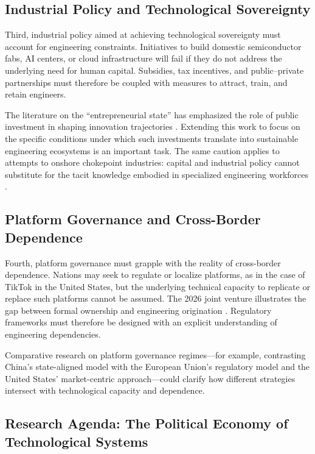 \documentclass[12pt,letterpaper]{article}
\begin{document}
\subsection{Industrial Policy and Technological Sovereignty}

Third, industrial policy aimed at achieving technological sovereignty must account for engineering constraints. Initiatives to build domestic semiconductor fabs, AI centers, or cloud infrastructure will fail if they do not address the underlying need for human capital. Subsidies, tax incentives, and public--private partnerships must therefore be coupled with measures to attract, train, and retain engineers.

The literature on the ``entrepreneurial state'' has emphasized the role of public investment in shaping innovation trajectories \cite{mazzucato2013}. Extending this work to focus on the specific conditions under which such investments translate into sustainable engineering ecosystems is an important task. The same caution applies to attempts to onshore chokepoint industries: capital and industrial policy cannot substitute for the tacit knowledge embodied in specialized engineering workforces \cite{miller2022}.

\subsection{Platform Governance and Cross-Border Dependence}

Fourth, platform governance must grapple with the reality of cross-border dependence. Nations may seek to regulate or localize platforms, as in the case of TikTok in the United States, but the underlying technical capacity to replicate or replace such platforms cannot be assumed. The 2026 joint venture illustrates the gap between formal ownership and engineering origination \cite{tiktokusds2026,forristal2026}. Regulatory frameworks must therefore be designed with an explicit understanding of engineering dependencies.

Comparative research on platform governance regimes---for example, contrasting China's state-aligned model with the European Union's regulatory model and the United States' market-centric approach---could clarify how different strategies intersect with technological capacity and dependence.

\subsection{Research Agenda: The Political Economy of Technological Systems}
\end{document}
